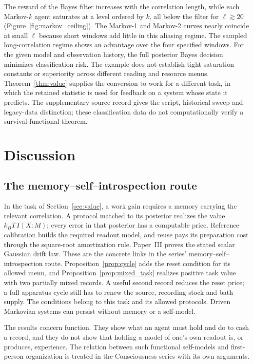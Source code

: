 \documentclass[12pt]{article}
\begin{document}
The reward of the Bayes filter increases with the correlation length, while each Markov-$k$ agent saturates at a level ordered by $k$, all below the filter for $\ell\gtrsim20$ (Figure~\ref{fig:markov_ceiling}). The Markov-1 and Markov-2 curves nearly coincide at small $\ell$ because short windows add little in this aliasing regime. The sampled long-correlation regime shows an advantage over the four specified windows. For the given model and observation history, the full posterior Bayes decision minimizes classification risk. The example does not establish tight saturation constants or superiority across different reading and resource menus. Theorem~\ref{thm:value} supplies the conversion to work for a different task, in which the retained statistic is used for feedback on a system whose state it predicts. The supplementary source record gives the script, historical sweep and legacy-data distinction; these classification data do not computationally verify a survival-functional theorem.

\section{Discussion}
\label{sec:discussion}

\subsection{The memory--self--introspection route}

In the task of Section~\ref{sec:value}, a work gain requires a memory carrying the relevant correlation. A protocol matched to its posterior realizes the value $k_BT\,I(X{:}M)$; every error in that posterior has a computable price. Reference calibration builds the required readout model, and reuse pays its preparation cost through the square-root amortization rule. Paper~III proves the stated scalar Gaussian drift law. These are the concrete links in the series' memory--self--introspection route. Proposition~\ref{prop:cycle} adds the reset condition for its allowed menu, and Proposition~\ref{prop:mixed_task} realizes positive task value with two partially mixed records. A useful second record reduces the reset price; a full apparatus cycle still has to renew the source, recording stock and bath supply. The conditions belong to this task and its allowed protocols. Driven Markovian systems can persist without memory or a self-model.

The results concern function. They show what an agent must hold and do to cash a record, and they do not show that holding a model of one's own readout is, or produces, experience. The relation between such functional self-models and first-person organization is treated in the Consciousness series with its own arguments.
\end{document}
